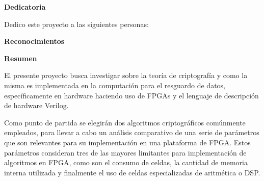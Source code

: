 \begin{center}\huge{\textbf{Dedicatoria}}\end{center}

Dedico este proyecto a las siguientes personas:
\blinditemize
\cleardoublepage

\begin{center}\huge{\textbf{Reconocimientos}}\end{center}
\blindtext
\cleardoublepage

\begin{center}\huge{\textbf{Resumen}}\end{center}


El presente proyecto busca investigar sobre la teoría de criptografía y como la misma es implementada en la computación para el resguardo de datos, específicamente en hardware haciendo uso de FPGAs y el lenguaje de descripción de hardware Verilog. 

Como punto de partida se elegirán dos algoritmos criptográficos comúnmente empleados, para llevar a cabo un análisis comparativo de una serie de parámetros que son relevantes para su implementación en una plataforma de FPGA. Estos parámetros consideran tres de las mayores limitantes para implementación de algoritmos en FPGA, como son el consumo de celdas, la cantidad de memoria interna utilizada y finalmente el uso de celdas especializadas de aritmética o DSP.
